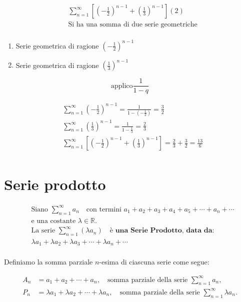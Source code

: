 \documentclass{article}
\begin{document}
\begin{align*}
        &\sum_{n=1}^{\infty} \left[\left( -\frac{1}{2}\right)^{n-1} + \left (\frac{1}{3}\right )^{n-1} \right] (2) \\
        &\text{Si ha una somma di due serie geometriche} \\
\end{align*}

    
    
\begin{enumerate}
        \item Serie geometrica di ragione $\left(-\frac{1}{2}\right)^{n-1}$
        \item Serie geometrica di ragione $\left(\frac{1}{3}\right)^{n-1}$
\end{enumerate}
    \[
        \text{applico} \frac{1}{1-q}
    \]

   \begin{align*}
        &\sum_{n=1}^{\infty} \left( -\frac{1}{2} \right)^{n-1}  = \frac{1}{1 - \left(-\frac{1}{2}\right)} =  \frac{3}{2} \\
        &\sum_{n=1}^{\infty} \left( \frac{1}{3} \right)^{n-1}  = \frac{1}{1 - \frac{1}{3}} = \frac{2}{3} \\
        &\sum_{n=1}^{\infty} \left[\left( -\frac{1}{2}\right)^{n-1} + \left (\frac{1}{3}\right )^{n-1} \right] = \frac{2}{3}+\frac{3}{2} = \frac{13}{6} \\
    \end{align*}

   \section*{Serie prodotto}

\begin{align*}
    &\text{Siano } \sum_{n=1}^{\infty} a_n \quad \text{con termini } a_1 + a_2 + a_3 + a_4 + a_5 + \cdots + a_n + \cdots \\
    &\text{e una costante } \lambda \in \mathbb{R}. \\
    &\text{La serie } \sum_{n=1}^{\infty} \left(\lambda a_n\right) \quad \textbf{è una Serie Prodotto, data da:} \\
    &\lambda a_1 + \lambda a_2 + \lambda a_3 + \cdots + \lambda a_n + \cdots \\
\end{align*}

Definiamo la somma parziale \( n \)-esima di ciascuna serie come segue:

\begin{align*}
    A_n &= a_1 + a_2 + \cdots + a_n, \quad \text{somma parziale della serie } \sum_{n=1}^{\infty} a_n, \\
    P_n &= \lambda a_1 + \lambda a_2 + \cdots + \lambda a_n, \quad \text{somma parziale della serie } \sum_{n=1}^{\infty} \lambda a_n.
\end{align*}
\end{document}

